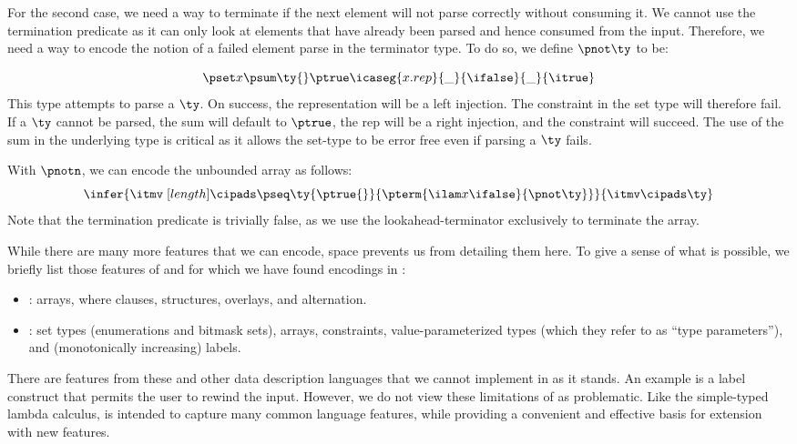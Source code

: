 For the second case, we need a way to terminate if the next element
will not parse correctly without consuming it. We cannot use the
termination predicate as it can only look at elements that have
already been parsed and hence consumed from the input. Therefore, we
need a way to encode the notion of a failed element parse in the
terminator type. To do so, we define $\pnot \ty$ to be:

 {\small
\[
\pset x {\psum \ty {} \ptrue} {\icaseg {x.rep} {\_}
  {\ifalse} {\_} {\itrue}}
\]}%
\noindent
This type attempts to parse a $\ty$. On success, the representation will be a left
injection. The constraint in the set type will therefore fail. If a
$\ty$ cannot be parsed, the sum will default to $\ptrue$, the rep will
be a right injection, and the constraint will succeed. The use of the
sum in the underlying type is critical as it allows the set-type to be
error free even if parsing a $\ty$ fails.

With $\pnotn$, we can encode the unbounded \datascript{} array as
follows:
\[
  \infer{
    \itmv \; [{length}] \cipads 
    \pseq \ty {\ptrue{}} {\pterm {\ilam x {} \ifalse} {\pnot \ty}}
  }{ 
    \itmv \cipads \ty
  }
\]
Note that the termination predicate is trivially false, as we use the
lookahead-terminator exclusively to terminate the array.

While there are many more features that we can encode, space prevents us from
detailing them here. To give a sense of what is possible, we
briefly list those features of \datascript{} and \packettypes{} for
which we have found encodings in \ddc{}:
\begin{itemize}
\item \packettypes{}: arrays, where clauses, structures, overlays,
  and alternation.
\item \datascript{}: set types (enumerations and bitmask sets),
  arrays, constraints, value-parameterized types (which they refer to
  as ``type parameters''), and (monotonically increasing) labels.
\end{itemize}

There are features from these and other data description languages
that we cannot implement in \ddc{} as it stands.  An example is a label construct that permits the user to rewind the input. However, we do not view these limitations of
\ddc{} as problematic. Like the simple-typed lambda calculus, \ddc{}
is intended to capture many common language features, while providing
a convenient and effective basis for extension with new features.


